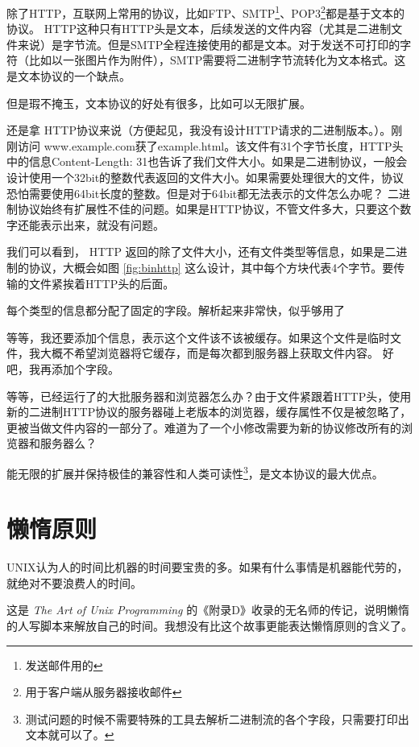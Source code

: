 除了HTTP，互联网上常用的协议，比如FTP、SMTP\footnote{发送邮件用的}、POP3\footnote{用于客户端从服务器接收邮件}都是基于文本的协议。
HTTP这种只有HTTP头是文本，后续发送的文件内容（尤其是二进制文件来说）是字节流。但是SMTP全程连接使用的都是文本。对于发送不可打印的字符（比如以一张图片作为附件），SMTP需要将二进制字节流转化为文本格式。这是文本协议的一个缺点。

但是瑕不掩玉，文本协议的好处有很多，比如可以无限扩展。

还是拿 HTTP协议来说（方便起见，我没有设计HTTP请求的二进制版本。）。刚刚访问 www.example.com获了example.html。该文件有31个字节长度，HTTP头中的信息Content-Length: 31也告诉了我们文件大小。如果是二进制协议，一般会设计使用一个32bit的整数代表返回的文件大小。如果需要处理很大的文件，协议恐怕需要使用64bit长度的整数。但是对于64bit都无法表示的文件怎么办呢？ 二进制协议始终有扩展性不佳的问题。如果是HTTP协议，不管文件多大，只要这个数字还能表示出来，就没有问题。

我们可以看到， HTTP 返回的除了文件大小，还有文件类型等信息，如果是二进制的协议，大概会如图 \ref{fig:binhttp} 这么设计，其中每个方块代表4个字节。要传输的文件紧挨着HTTP头的后面。


每个类型的信息都分配了固定的字段。解析起来非常快，似乎够用了

等等，我还要添加个信息，表示这个文件该不该被缓存。如果这个文件是临时文件，我大概不希望浏览器将它缓存，而是每次都到服务器上获取文件内容。
好吧，我再添加个字段。


等等，已经运行了的大批服务器和浏览器怎么办？由于文件紧跟着HTTP头，使用新的二进制HTTP协议的服务器碰上老版本的浏览器，缓存属性不仅是被忽略了，更被当做文件内容的一部分了。难道为了一个小修改需要为新的协议修改所有的浏览器和服务器么？

能无限的扩展并保持极佳的兼容性和人类可读性\footnote{测试问题的时候不需要特殊的工具去解析二进制流的各个字段，只需要打印出文本就可以了。}，是文本协议的最大优点。

\section{懒惰原则}

UNIX认为人的时间比机器的时间要宝贵的多。如果有什么事情是机器能代劳的，就绝对不要浪费人的时间。

这是 \textit{The Art of Unix Programming} 的《附录D》收录的无名师的传记，说明懒惰的人写脚本来解放自己的时间。我想没有比这个故事更能表达懒惰原则的含义了。


